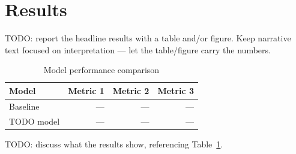 \section{Results}
\label{sec:results}

TODO: report the headline results with a table and/or figure. Keep
narrative text focused on interpretation — let the table/figure carry the
numbers.

\begin{table}[htbp]
    \centering
    \caption{Model performance comparison}
    \label{tab:results}
    \begin{tabular}{@{}lrrr@{}}
        \toprule
        \textbf{Model} & \textbf{Metric 1} & \textbf{Metric 2} & \textbf{Metric 3} \\
        \midrule
        Baseline    & --- & --- & --- \\
        TODO model  & --- & --- & --- \\
        \bottomrule
    \end{tabular}
\end{table}

TODO: discuss what the results show, referencing Table~\ref{tab:results}.
